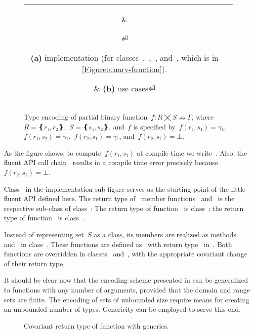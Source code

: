 \begin{figure}[hbt]
  \caption{\label{Figure:simple-binary}%
    Type encoding of partial binary function~$f:R⨉S↛Γ$,
    where~$R=❴r₁,r₂❵$,~$S=❴s₁,s₂❵$, and~$f$
    is specified by~$f(r₁,s₁)=γ₁$,~$f(r₁,s₂)=γ₂$,~$f(r₂,s₁)=γ₁$, and~$f(r₂, s₂)=⊥$.}
  \begin{tabular}{cc}
    \hspace{-3.5ex}
    \parbox[c]{0.57\linewidth}{%
    }
      &
    \hspace{-16ex}
    \parbox[c]{51ex}{}
⏎
    \parbox{0.57\linewidth}
    {\textbf{(a)} implementation (for classes~,~,~, and~,
    which is in \cref{Figure:unary-function}).}
      & \hspace{-5ex}\textbf{(b)} use cases⏎
  \end{tabular}
\end{figure}

As the figure shows, to compute~$f(r₁,s₁)$ at compile time we write~.
Also, the fluent API call chain~ results in a compile time
  error precisely because~$f(r₂, s₂)=⊥$.

Class~ in the implementation sub-figure serves as
  the starting point of the little fluent API defined here.
The return type of~ member functions~ and~
  is the respective sub-class of class~:
The return type of function~ is class~;
  the return type of function~ is class~.

Instead of representing set~$S$ as a class,
  its members are realized as methods~ and~ in class~.
These functions are defined as~ with return type~
  in~.
Both functions are overridden in classes~ and~,
   with the appropriate covariant change of their return type,

It should be clear now that the encoding scheme presented
  in  can be generalized to functions
  with any number of arguments, provided that the domain and range sets are finite.
The encoding of sets of unbounded size require means for creating an unbounded
 number of types.
Genericity can be employed to serve this end.

\begin{wrapfigure}[8]{r}{29ex}
  \caption{\label{Figure:id}%
  Covariant return type of function 
  with \Java generics.
  }
\end{wrapfigure}


